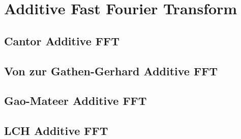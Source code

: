 \newpage

\section{Additive Fast Fourier Transform}

\subsection{Cantor Additive FFT}

\subsection{Von zur Gathen-Gerhard Additive FFT}

\subsection{Gao-Mateer Additive FFT}

\subsection{LCH Additive FFT}

